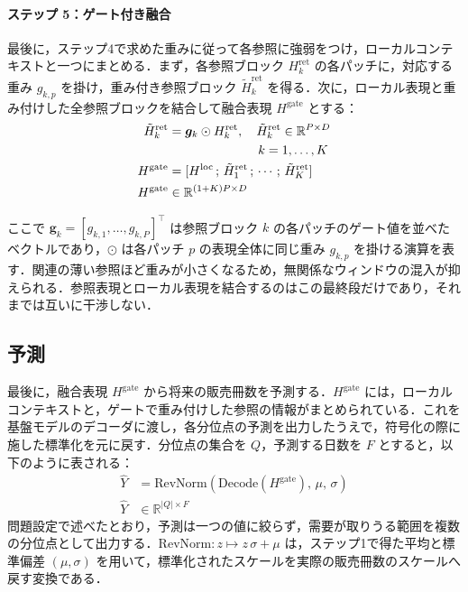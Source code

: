\documentclass[twocolumn, lastpage]{jarticle}
\begin{document}
    \paragraph{ステップ 5：ゲート付き融合}
    最後に，ステップ4で求めた重みに従って各参照に強弱をつけ，ローカルコンテキストと一つにまとめる．まず，各参照ブロック $H^{\mathrm{ret}}_k$ の各パッチに，対応する重み $g_{k,p}$ を掛け，重み付き参照ブロック $\tilde{H}^{\mathrm{ret}}_k$ を得る．次に，ローカル表現と重み付けした全参照ブロックを結合して融合表現 $H^{\mathrm{gate}}$ とする：
        \begin{align}
            \tilde{H}^{\mathrm{ret}}_k &= \bm{g}_k \odot H^{\mathrm{ret}}_k, \quad \tilde{H}^{\mathrm{ret}}_k \in \mathbb{R}^{P \times D} \\
            & \hspace{25mm} k = 1, \ldots, K \nonumber \\
            H^{\mathrm{gate}} &= [H^{\mathrm{loc}} \,;\,
            \tilde{H}^{\mathrm{ret}}_1 \,;\, \cdots \,;\,
            \tilde{H}^{\mathrm{ret}}_K] \\
            H^{\mathrm{gate}} &\in \mathbb{R}^{(1+K)P \times D} \nonumber
        \end{align}

    ここで $\bm{g}_k = [g_{k,1}, \ldots, g_{k,P}]^\top$ は参照ブロック $k$ の各パッチのゲート値を並べたベクトルであり，$\odot$ は各パッチ $p$ の表現全体に同じ重み $g_{k,p}$ を掛ける演算を表す．関連の薄い参照ほど重みが小さくなるため，無関係なウィンドウの混入が抑えられる．参照表現とローカル表現を結合するのはこの最終段だけであり，それまでは互いに干渉しない．


\subsection{予測}
最後に，融合表現 $H^{\mathrm{gate}}$ から将来の販売冊数を予測する．$H^{\mathrm{gate}}$ には，ローカルコンテキストと，ゲートで重み付けした参照の情報がまとめられている．これを基盤モデルのデコーダに渡し，各分位点の予測を出力したうえで，符号化の際に施した標準化を元に戻す．分位点の集合を $Q$，予測する日数を $F$ とすると，以下のように表される：
    \begin{align}
        \hat{Y} &= \mathrm{RevNorm}(\mathrm{Decode}(H^{\mathrm{gate}}),\, \mu,\, \sigma) \\
        \hat{Y} &\in \mathbb{R}^{|Q| \times F} \nonumber
    \end{align}
問題設定で述べたとおり，予測は一つの値に絞らず，需要が取りうる範囲を複数の分位点として出力する．$\mathrm{RevNorm}: z \mapsto z\,\sigma + \mu$ は，ステップ1で得た平均と標準偏差 $(\mu, \sigma)$ を用いて，標準化されたスケールを実際の販売冊数のスケールへ戻す変換である．
\end{document}
